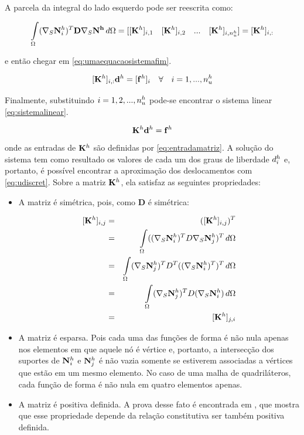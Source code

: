 A parcela da integral do lado esquerdo pode ser reescrita como:

\begin{equation}
\omeint{(\sopnabla \basefunctionfine)^T \mathbf{D} \sopnabla \mathbf{N^h} }= [ [\rigidmatrix]_{i,1}\quad   [\rigidmatrix]_{i,2} \quad ... \quad  [\rigidmatrix]_{i,\qtdfreedomfine}] =  [\rigidmatrix]_{i,:}
\end{equation}

e então chegar em \eqref{eq:umaequacaosistemafim}.

\begin{equation} \label{eq:umaequacaosistemafim}
[\rigidmatrix]_{i,:} \mathbf{d}^h = [\mathbf{f}^h]_i \quad \forall \quad i=1,..., \qtdfreedomfine
\end{equation}

Finalmente, substituindo  $i = 1, 2, ..., \qtdfreedomfine$ pode-se encontrar o sistema linear \eqref{eq:sistemalinear}.

\begin{equation}\label{eq:sistemalinear}
    \rigidmatrix \mathbf{d}^h = \mathbf{f}^h
\end{equation}
onde as entradas de $\rigidmatrix $ são definidas por \eqref{eq:entradamatriz}. A solução do sistema tem como resultado os valores de cada um dos graus de liberdade $\freedomfine$ e, portanto, é possível encontrar a aproximação dos deslocamentos com \eqref{eq:udiscret}. Sobre a matriz $\rigidmatrix$, ela satisfaz as seguintes propriedades:


\begin{itemize}
    \item A matriz é simétrica, pois, como $\mathbf{D}$ é simétrica:

    \begin{eqnarray}
    \rigidmatrixentry & = & (\rigidmatrixentry)^T \\
            & = & \omeint{((\sopnabla \basefunctionfine)^T D \sopnabla \basefunctionfine[j])^T} \\
            & = & \omeint{ ( \sopnabla \basefunctionfine[j])^T D^T  ((\sopnabla \basefunctionfine)^T)^T}\\
            & = & \omeint{ ( \sopnabla \basefunctionfine[j])^T D  (\sopnabla \basefunctionfine)} \\
            & = & [\rigidmatrix]_{j,i}
    \end{eqnarray}


    \item A matriz é esparsa. Pois cada uma das funções de forma é não nula apenas nos elementos em que aquele nó é vértice e, portanto, a intersecção dos suportes de $\basefunctionfine$ e $\basefunctionfine[j]$ é não vazia somente se estiverem associadas a vértices que estão em um mesmo elemento. No caso de uma malha de quadriláteros, cada função de forma é não nula em quatro elementos apenas.

    \item A matriz é positiva definida. A prova desse fato é encontrada em \cite{hughes}, que mostra que esse propriedade depende da relação constitutiva ser também positiva definida.
\end{itemize}


